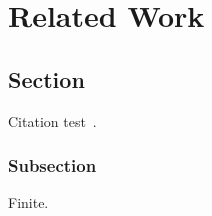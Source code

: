 \chapter{Related Work}\label{chapter:related}

\section{Section}
Citation test~\parencite{Paulson1989}.

\subsection{Subsection}

Finite.